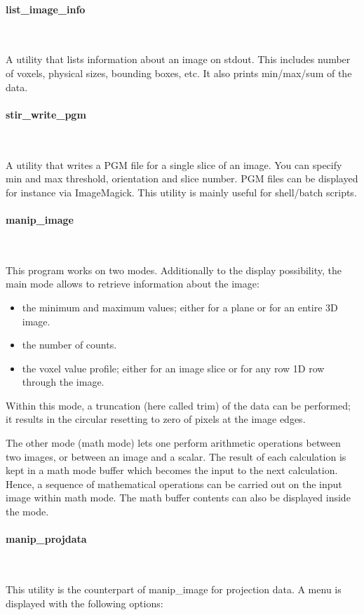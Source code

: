 \documentclass{article}
\newcommand{\subsubsubsection}[1]{\paragraph{#1}\mbox{} \\}
\begin{document}
{{ \subsubsubsection{list\_image\_info}
}

A utility that lists information about an image on stdout. This includes number of voxels,
physical sizes, bounding boxes, etc. It also prints min/max/sum of the data. 

{ \subsubsubsection{stir\_write\_pgm}
}

A utility that writes a PGM file for a single slice of an image. You can specify min and max threshold,
orientation and slice number. PGM files can be displayed for instance via ImageMagick.
This utility is mainly useful for shell/batch scripts.

{ \subsubsubsection{manip\_image}
}

This program works on two modes. Additionally to the display 
possibility, the main mode allows to retrieve information about 
the image:

\begin{itemize}
\item the minimum and maximum values; either for a plane or for an 
entire 3D image.
\item the number of counts.
\item the voxel value profile; either for an image slice or for any 
row 1D row through the image.
\end{itemize}
Within this mode, a truncation (here called trim) of the data 
can be performed; it results in the circular resetting to zero 
of pixels at the image edges.


The other mode (math mode) lets one perform arithmetic operations 
between two images, or between an image and a scalar. The result 
of each calculation is kept in a math mode buffer which becomes 
the input to the next calculation. Hence, a sequence of mathematical 
operations can be carried out on the input image within math 
mode. The math buffer contents can also be displayed inside the 
mode.

{ \subsubsubsection{manip\_projdata}
}

This utility is the counterpart of manip\_image for projection 
data. A menu is displayed with the following options:

}
\end{document}

